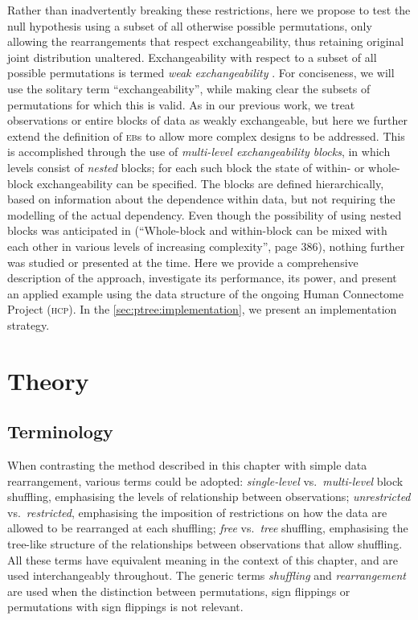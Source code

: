 Rather than inadvertently breaking these restrictions, here we propose to test the null hypothesis using a subset of all otherwise possible permutations, only allowing the rearrangements that respect exchangeability, thus retaining original joint distribution unaltered. Exchangeability with respect to a subset of all possible permutations is termed \emph{weak exchangeability} \citep{Good2005}. For conciseness, we will use the solitary term ``exchangeability'', while making clear the subsets of permutations for which this is valid. As in our previous work, we treat observations or entire blocks of data as weakly exchangeable, but here we further extend the definition of \textsc{eb}s to allow more complex designs to be addressed. This is accomplished through the use of \emph{multi-level exchangeability blocks}, in which levels consist of \emph{nested} blocks; for each such block the state of within- or whole-block exchangeability can be specified. The blocks are defined hierarchically, based on information about the dependence within data, but not requiring the modelling of the actual dependency. Even though the possibility of using nested blocks was anticipated in \citet{Winkler2014} (``Whole-block and within-block can be mixed with each other in various levels of increasing complexity'', page 386), nothing further was studied or presented at the time. Here we provide a comprehensive description of the approach, investigate its performance, its power, and present an applied example using the data structure of the ongoing Human Connectome Project (\textsc{hcp}). In the \ref{sec:ptree:implementation}, we present an implementation strategy.

\section{Theory}

\subsection{Terminology}

When contrasting the method described in this chapter with simple data rearrangement, various terms could be adopted: \emph{single-level} vs.\ \emph{multi-level} block shuffling, emphasising the levels of relationship between observations; \emph{unrestricted} vs.\ \emph{restricted}, emphasising the imposition of restrictions on how the data are allowed to be rearranged at each shuffling; \emph{free} vs.\ \emph{tree} shuffling, emphasising the tree-like structure of the relationships between observations that allow shuffling. All these terms have equivalent meaning in the context of this chapter, and are used interchangeably throughout. The generic terms \emph{shuffling} and \emph{rearrangement} are used when the distinction between permutations, sign flippings or permutations with sign flippings is not relevant.

